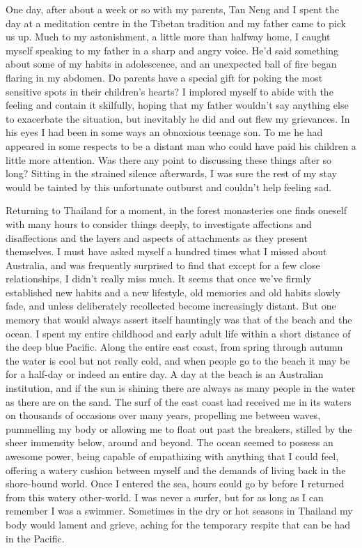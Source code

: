 One day, after about a week or so with my parents, Tan Neng and I spent
the day at a meditation centre in the Tibetan tradition and my father
came to pick us up. Much to my astonishment, a little more than halfway
home, I caught myself speaking to my father in a sharp and angry voice. 
He'd said something about some of my habits in adolescence, and an
unexpected ball of fire began flaring in my abdomen. Do parents have a
special gift for poking the most sensitive spots in their children's
hearts? I implored myself to abide with the feeling and contain it
skilfully, hoping that my father wouldn't say anything else to
exacerbate the situation, but inevitably he did and out flew my
grievances. In his eyes I had been in some ways an obnoxious teenage
son. To me he had appeared in some respects to be a distant man who
could have paid his children a little more attention. Was there any
point to discussing these things after so long? Sitting in the strained
silence afterwards, I was sure the rest of my stay would be tainted by
this unfortunate outburst and couldn't help feeling sad. 

Returning to Thailand for a moment, in the forest monasteries one finds
oneself with many hours to consider things deeply, to investigate
affections and disaffections and the layers and aspects of attachments
as they present themselves. I must have asked myself a hundred times
what I missed about Australia, and was frequently surprised to find that
except for a few close relationships, I didn't really miss much. It
seems that once we've firmly established new habits and a new lifestyle, 
old memories and old habits slowly fade, and unless deliberately
recollected become increasingly distant. But one memory that would
always assert itself hauntingly was that of the beach and the ocean. I
spent my entire childhood and early adult life within a short distance
of the deep blue Pacific. Along the entire east coast, from spring
through autumn the water is cool but not really cold, and when people go
to the beach it may be for a half-day or indeed an entire day. A day at
the beach is an Australian institution, and if the sun is shining there
are always as many people in the water as there are on the sand. The
surf of the east coast had received me in its waters on thousands of
occasions over many years, propelling me between waves, pummelling my
body or allowing me to float out past the breakers, stilled by the sheer
immensity below, around and beyond. The ocean seemed to possess an
awesome power, being capable of empathizing with anything that I could
feel, offering a watery cushion between myself and the demands of living
back in the shore-bound world. Once I entered the sea, hours could go by
before I returned from this watery other-world. I was never a surfer, 
but for as long as I can remember I was a swimmer. Sometimes in the dry
or hot seasons in Thailand my body would lament and grieve, aching for
the temporary respite that can be had in the Pacific. 

